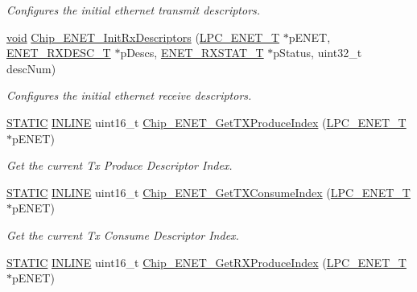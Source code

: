\begin{DoxyCompactItemize}
\begin{DoxyCompactList}\small\item\em Configures the initial ethernet transmit descriptors. \end{DoxyCompactList}\item 
\hyperlink{Paradigm_2Tern__EE_2small_2portmacro_8h_a14d32f8130d3c0b212cfc751730b5b49}{void} \hyperlink{group__ENET__17XX__40XX_ga04559be4fcfb24203ce9e372750383c1}{Chip\-\_\-\-E\-N\-E\-T\-\_\-\-Init\-Rx\-Descriptors} (\hyperlink{structLPC__ENET__T}{L\-P\-C\-\_\-\-E\-N\-E\-T\-\_\-\-T} $\ast$p\-E\-N\-E\-T, \hyperlink{structENET__RXDESC__T}{E\-N\-E\-T\-\_\-\-R\-X\-D\-E\-S\-C\-\_\-\-T} $\ast$p\-Descs, \hyperlink{structENET__RXSTAT__T}{E\-N\-E\-T\-\_\-\-R\-X\-S\-T\-A\-T\-\_\-\-T} $\ast$p\-Status, uint32\-\_\-t desc\-Num)
\begin{DoxyCompactList}\small\item\em Configures the initial ethernet receive descriptors. \end{DoxyCompactList}\item 
\hyperlink{group__LPC__Types__Public__Macros_ga10b2d890d871e1489bb02b7e70d9bdfb}{S\-T\-A\-T\-I\-C} \hyperlink{group__LPC__Types__Public__Types_ga2eb6f9e0395b47b8d5e3eeae4fe0c116}{I\-N\-L\-I\-N\-E} uint16\-\_\-t \hyperlink{group__ENET__17XX__40XX_ga276d359d20f70fdb005740c3287dd2d7}{Chip\-\_\-\-E\-N\-E\-T\-\_\-\-Get\-T\-X\-Produce\-Index} (\hyperlink{structLPC__ENET__T}{L\-P\-C\-\_\-\-E\-N\-E\-T\-\_\-\-T} $\ast$p\-E\-N\-E\-T)
\begin{DoxyCompactList}\small\item\em Get the current Tx Produce Descriptor Index. \end{DoxyCompactList}\item 
\hyperlink{group__LPC__Types__Public__Macros_ga10b2d890d871e1489bb02b7e70d9bdfb}{S\-T\-A\-T\-I\-C} \hyperlink{group__LPC__Types__Public__Types_ga2eb6f9e0395b47b8d5e3eeae4fe0c116}{I\-N\-L\-I\-N\-E} uint16\-\_\-t \hyperlink{group__ENET__17XX__40XX_ga6ed1ce4f6bde22c64966d2d513cc7a6d}{Chip\-\_\-\-E\-N\-E\-T\-\_\-\-Get\-T\-X\-Consume\-Index} (\hyperlink{structLPC__ENET__T}{L\-P\-C\-\_\-\-E\-N\-E\-T\-\_\-\-T} $\ast$p\-E\-N\-E\-T)
\begin{DoxyCompactList}\small\item\em Get the current Tx Consume Descriptor Index. \end{DoxyCompactList}\item 
\hyperlink{group__LPC__Types__Public__Macros_ga10b2d890d871e1489bb02b7e70d9bdfb}{S\-T\-A\-T\-I\-C} \hyperlink{group__LPC__Types__Public__Types_ga2eb6f9e0395b47b8d5e3eeae4fe0c116}{I\-N\-L\-I\-N\-E} uint16\-\_\-t \hyperlink{group__ENET__17XX__40XX_gaa70d279d6bb31b783656b31fe3a1cf8f}{Chip\-\_\-\-E\-N\-E\-T\-\_\-\-Get\-R\-X\-Produce\-Index} (\hyperlink{structLPC__ENET__T}{L\-P\-C\-\_\-\-E\-N\-E\-T\-\_\-\-T} $\ast$p\-E\-N\-E\-T)

\end{DoxyCompactItemize}
